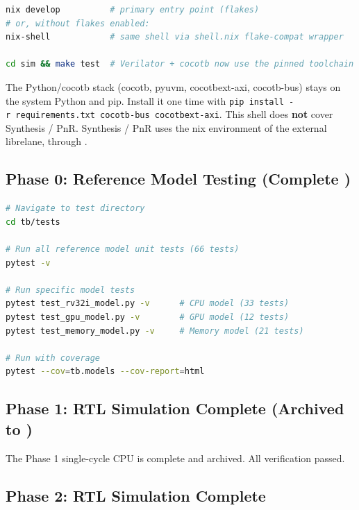 \begin{lstlisting}[language=bash]
nix develop          # primary entry point (flakes)
# or, without flakes enabled:
nix-shell            # same shell via shell.nix flake-compat wrapper

cd sim && make test  # Verilator + cocotb now use the pinned toolchain
\end{lstlisting}

The Python/\allowbreak{}cocotb stack (cocotb, pyuvm, cocotbext-axi, cocotb-bus) stays on the system Python and pip.
Install it one time with
\texttt{pip\ install\ -\allowbreak{}r\ requirements.\allowbreak{}txt\ cocotb-\allowbreak{}bus\ cocotbext-\allowbreak{}axi}.
This shell does \textbf{not} cover Synthesis / PnR.
Synthesis / PnR uses the nix environment of the external librelane, through .

\subsection{\texorpdfstring{Phase 0: Reference Model Testing (Complete
\ok{})}{Phase 0: Reference Model Testing (Complete )}}\label{um:guide:quick-start:phase-0-reference-model-testing-complete-white-check-mark}

\begin{lstlisting}[language=bash]
# Navigate to test directory
cd tb/tests

# Run all reference model unit tests (66 tests)
pytest -v

# Run specific model tests
pytest test_rv32i_model.py -v      # CPU model (33 tests)
pytest test_gpu_model.py -v        # GPU model (12 tests)
pytest test_memory_model.py -v     # Memory model (21 tests)

# Run with coverage
pytest --cov=tb.models --cov-report=html
\end{lstlisting}

\subsection{\texorpdfstring{Phase 1: RTL Simulation \ok{} Complete
(Archived to
)}{Phase 1: RTL Simulation  Complete (Archived to )}}\label{um:guide:quick-start:phase-1-rtl-simulation-white-check-mark-complete-archived-to-micro-p}

The Phase 1 single-cycle CPU is complete and archived.
All verification passed.

\subsection{\texorpdfstring{Phase 2: RTL Simulation \ok{}
Complete}{Phase 2: RTL Simulation  Complete}}\label{um:guide:quick-start:phase-2-rtl-simulation-white-check-mark-complete}

